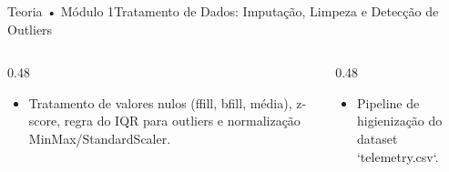 \begin{senaiframe}{Teoria • Módulo 1}{Tratamento de Dados: Imputação, Limpeza e Detecção de Outliers}
  \begin{columns}[t]
    \begin{column}{0.48\textwidth}
      \begin{tcolorbox}[senaibluecard, title={Fundamentos Teóricos}]
        \begin{itemize}
          \item Tratamento de valores nulos (ffill, bfill, média), z-score, regra do IQR para outliers e normalização MinMax/StandardScaler.
        \end{itemize}
      \end{tcolorbox}
    \end{column}
    \begin{column}{0.48\textwidth}
      \begin{tcolorbox}[senaigreencard, title={Prática \& Laboratório}]
        \begin{itemize}
          \item Pipeline de higienização do dataset `telemetry.csv`.
        \end{itemize}
      \end{tcolorbox}
    \end{column}
  \end{columns}
\end{senaiframe}
